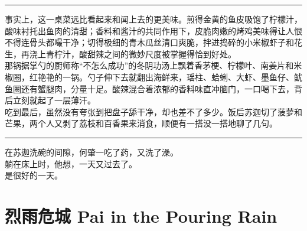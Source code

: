 \documentclass[oneside,11pt]{memoir} %
\begin{document}
\begin{CJK}{UTF8}{gbsn}
\rule{-3pt}{30pt}
    事实上，这一桌菜远比看起来和闻上去的更美味。煎得金黄的鱼皮吸饱了柠檬汁，酸味衬托出鱼肉的清甜；香料和酱汁的共同作用下，皮脆肉嫩的烤鸡美味得让人恨不得连骨头都嘬干净；切得极细的青木瓜丝清口爽脆，拌进捣碎的小米椒虾子和花生，再浇上青柠汁，酸甜辣之间的微妙尺度被掌握得恰到好处。\\\indent
    那锅据掌勺的厨师称“不怎么成功”的冬阴功汤上飘着香茅梗、柠檬叶、南姜片和米椒圈，红艳艳的一锅。勺子伸下去就翻出海鲜来，瑶柱、蛤蜊、大虾、墨鱼仔、鱿鱼圈还有蟹腿肉，分量十足。酸辣混合着浓郁的香料味直冲脑门，一口喝下去，背后立刻就起了一层薄汗。\\\indent
    吃到最后，虽然没有夸张到把盘子舔干净，却也差不了多少。饭后苏迦切了菠萝和芒果，两个人又剥了荔枝和百香果来消食，顺便有一搭没一搭地聊了几句。\\\indent
\rule{-3pt}{30pt}
    在苏迦洗碗的间隙，何肇一吃了药，又洗了澡。\\\indent
    躺在床上时，他想，一天又过去了。\\\indent
    是很好的一天。\\\indent


\newpage
\chapter{烈雨危城    Pai in the Pouring Rain}
\newpage

\end{CJK}
\end{document}
